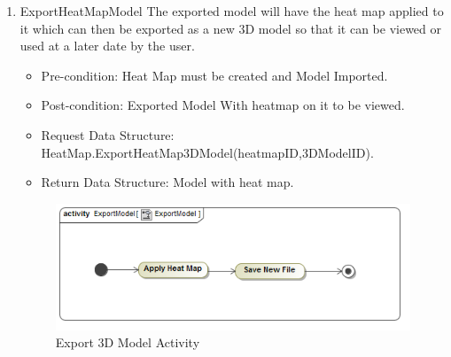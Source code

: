 \begin{enumerate}
		\item{ExportHeatMapModel}
		The exported model will have the heat map applied to it which can then be exported as a new 3D model so that it can be viewed or used at a later date by the user. 
		\begin{itemize}
			\item Pre-condition: Heat Map must be created and Model Imported.
			\item Post-condition: Exported Model With heatmap on it to be viewed.
			\item Request Data Structure: HeatMap.ExportHeatMap3DModel(heatmapID,3DModelID).
			\item Return Data Structure: Model with heat map.
		\end{itemize}
		
		\begin{figure}[!ht]
			\centering
			\includegraphics[scale=0.5]{Diagrams/Activity_Diagram__ExportModel__ExportModel.png}
			\caption{Export 3D Model Activity}
		\end{figure}
	\end{enumerate}

